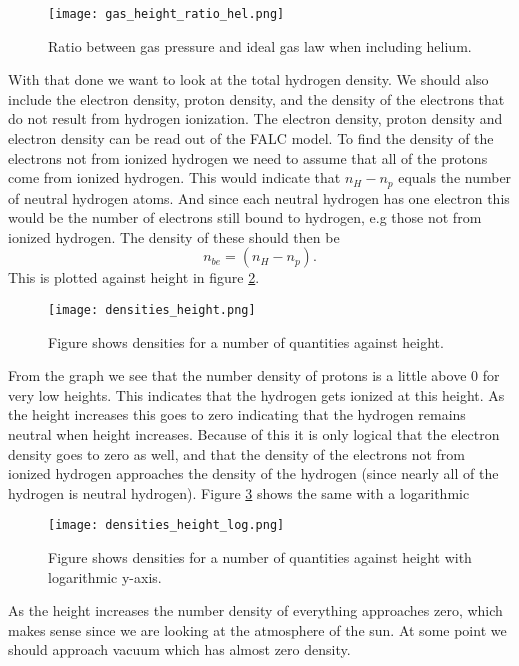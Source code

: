 \documentclass{aa}   %
\begin{document}
\begin{figure}
 \texttt{[image: gas\_height\_ratio\_hel.png]}
 \caption{Ratio between gas pressure and ideal gas law when including helium.}
 \label{gas_height_ratio_hel} 
\end{figure}

With that done we want to look at the total hydrogen density. We should also include the electron density, proton density, and the density of the electrons that do not result from hydrogen ionization. The electron density, proton density and electron density can be read out of the FALC model. To find the density of the electrons not from ionized hydrogen we need to assume that all of the protons come from ionized hydrogen. This would indicate that $n_H - n_p$ equals the number of neutral hydrogen atoms. And since each neutral hydrogen has one electron this would be the number of electrons still bound to hydrogen, e.g those not from ionized hydrogen. The density of these should then be
\begin{equation}
 n_{be} = (n_H - n_p).
\end{equation}
This is plotted against height in figure \ref{densities_height}. 
\begin{figure}
 \texttt{[image: densities\_height.png]}
 \caption{Figure shows densities for a number of quantities against height.}
 \label{densities_height} 
\end{figure}

From the graph we see that the number density of protons is a little above 0 for very low heights. This indicates that the hydrogen gets ionized at this height. As the height increases this goes to zero indicating that the hydrogen remains neutral when height increases. Because of this it is only logical that the electron density goes to zero as well, and that the density of the electrons not from ionized hydrogen approaches the density of the hydrogen (since nearly all of the hydrogen is neutral hydrogen). Figure \ref{densities_height_log} shows the same with a logarithmic
\begin{figure}
 \texttt{[image: densities\_height\_log.png]}
 \caption{Figure shows densities for a number of quantities against height with logarithmic y-axis.}
 \label{densities_height_log} 
\end{figure}

As the height increases the number density of everything approaches zero, which makes sense since we are looking at the atmosphere of the sun. At some point we should approach vacuum which has almost zero density.
\end{document}
